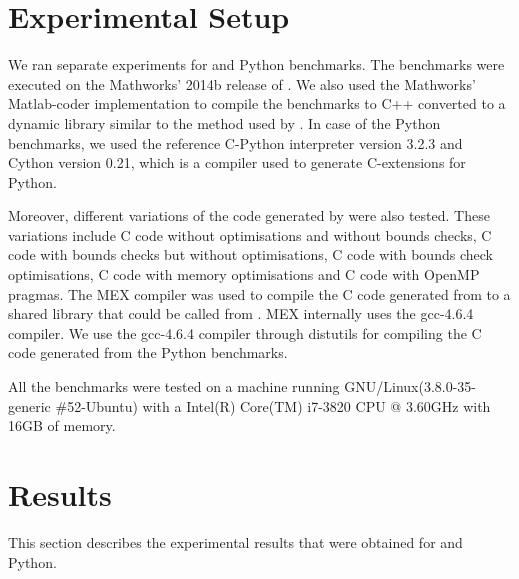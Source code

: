 \section{Experimental Setup}
We ran separate experiments for \matlab and Python benchmarks. The \matlab benchmarks were executed on the Mathworks' 2014b release of \matlab. We also used the Mathworks' Matlab-coder implementation to compile the benchmarks to C++ converted to a dynamic library similar to the method used by \velocty. In case of the Python benchmarks, we used the reference C-Python interpreter version 3.2.3  and Cython\cite{cython} version 0.21, which is a compiler used to generate C-extensions for Python.

Moreover, different variations of the code generated by \velocty were also tested. These variations include C code without optimisations and without bounds checks, C code with bounds checks but without optimisations, C code with bounds check optimisations, C code with memory optimisations and C code with OpenMP pragmas. The MEX compiler was used to compile the C code generated from \matlab to a shared library that could be called from \matlab. MEX internally uses the gcc-4.6.4 compiler. We use the gcc-4.6.4 compiler through distutils for compiling the C code generated from the Python benchmarks. 

All the benchmarks were tested on a machine running GNU/Linux(3.8.0-35-generic \#52-Ubuntu) with a Intel(R) Core(TM) i7-3820 CPU @ 3.60GHz with 16GB of memory. 
\section{Results}
This section describes the experimental results that were obtained for \matlab and Python.
